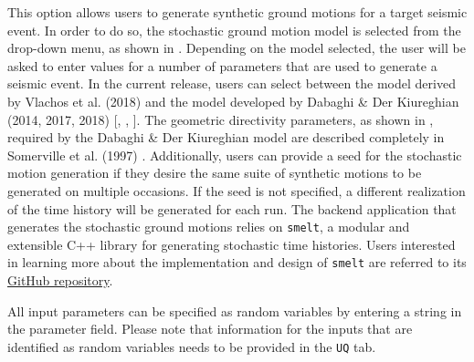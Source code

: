 This option allows users to generate synthetic ground motions for a
target seismic event. In order to do so, the stochastic ground motion
model is selected from the drop-down menu, as shown
in . Depending on the model selected, the
user will be asked to enter values for a number of parameters that are
used to generate a seismic event. In the current release, users can
select between the model derived by Vlachos et
al. (2018) \cite{vlachos2018predictive} and the model developed by
Dabaghi \& Der Kiureghian (2014, 2017, 2018)
[\cite{dabaghi2014stochastic}, \cite{dabaghi2017stochastic}, \cite{dabaghi2018simulation}]. The
geometric directivity parameters, as shown in , required by the Dabaghi \& Der
Kiureghian model are described completely in Somerville et al. (1997)
\cite{somerville1997modification}. Additionally, users can provide a
seed for the stochastic motion generation if they desire the same
suite of synthetic motions to be generated on multiple occasions.  If
the seed is not specified, a different realization of the time history
will be generated for each run. The backend application that generates
the stochastic ground motions relies on \texttt{smelt}, a modular and
extensible C++ library for generating stochastic time histories. Users
interested in learning more about the implementation and design of
\texttt{smelt} are referred to its
\href{https://github.com/NHERI-SimCenter/smelt}{GitHub repository}.

All input parameters can be specified as random variables by entering
a string in the parameter field. Please note that information for the
inputs that are identified as random variables needs to be provided in
the \texttt{UQ} tab.


